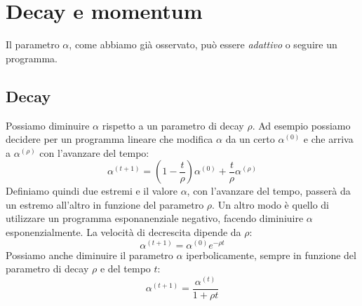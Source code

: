 \documentclass{article}
\begin{document}
    \section{Decay e momentum}
        Il parametro $\alpha$, come abbiamo già osservato, può essere \emph{adattivo} o seguire un programma.
        \subsection{Decay}
            Possiamo diminuire $\alpha$ rispetto a un parametro di decay $\rho$. Ad esempio possiamo decidere per un programma 
            lineare che modifica $\alpha$ da un certo $\alpha^{(0)}$ e che arriva a $\alpha^{(\rho)}$ con l'avanzare del tempo:
                \[\alpha^{(t+1)} = (1-\frac{t}{\rho})\alpha^{(0)} + \frac{t}{\rho}\alpha^{(\rho)} \]
            Definiamo quindi due estremi e il valore $\alpha$, con l'avanzare del tempo, passerà da un estremo all'altro in funzione del 
            parametro $\rho$. Un altro modo è quello di utilizzare un programma esponanenziale negativo, facendo diminiuire $\alpha$ 
            esponenzialmente. La velocità di decrescita dipende da $\rho$:
            \[\alpha^{(t+1)} = \alpha^{(0)}e^{-\rho t}\]
            Possiamo anche diminuire il parametro $\alpha$ iperbolicamente, sempre in funzione del parametro di decay $\rho$ e del tempo $t$:
                \[\alpha^{(t+1)} = \frac{\alpha^{(t)}}{1+\rho t}\]
\end{document}
